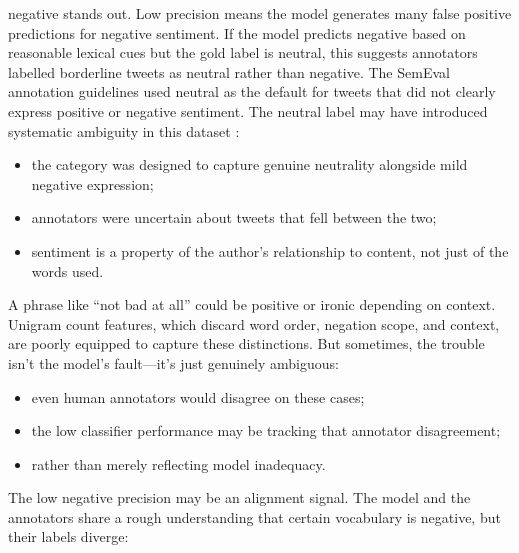 \documentclass[12pt]{article}
\begin{document}
negative stands out. Low precision means the model generates many false positive predictions for negative sentiment. If the model predicts negative based on reasonable lexical cues but the gold label is neutral, this suggests annotators labelled borderline tweets as neutral rather than negative. The SemEval annotation guidelines used neutral as the default for tweets that did not clearly express positive or negative sentiment. The neutral label may have introduced systematic ambiguity in this dataset \citep{kenyondean2018sentiment}:

\begin{itemize}

  \item the category was designed to capture genuine neutrality alongside mild negative expression;

  \item annotators were uncertain about tweets that fell between the two;

  \item sentiment is a property of the author's relationship to content, not just of the words used.

\end{itemize}

A phrase like ``not bad at all'' could be positive or ironic depending on context. Unigram count features, which discard word order, negation scope, and context, are poorly equipped to capture these distinctions. But sometimes, the trouble isn't the model's fault---it's just genuinely ambiguous:

\begin{itemize}

  \item even human annotators would disagree on these cases;

  \item the low classifier performance may be tracking that annotator disagreement;

  \item rather than merely reflecting model inadequacy.

\end{itemize}

The low negative precision may be an alignment signal. The model and the annotators share a rough understanding that certain vocabulary is negative, but their labels diverge:
\end{document}
